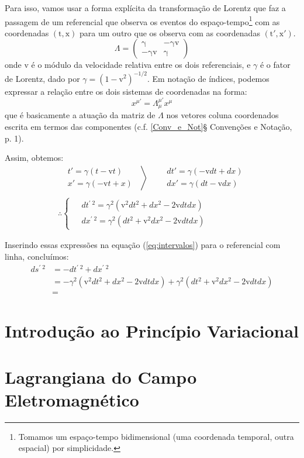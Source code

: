 \documentclass[12pt,a4paper]{article}
\begin{document}
Para isso, vamos   usar a forma explícita da transformação de Lorentz que faz a passagem de
um referencial que observa os eventos do espaço-tempo\footnote{Tomamos um espaço-tempo bidimensional (uma coordenada temporal, outra espacial) por simplicidade.} com as coordenadas $\mathrm{(t,x)}$ para um outro que
os observa com as coordenadas $\mathrm{(t',x')}$.
\begin{equation*}
  \Lambda = \begin{pmatrix*} \mathrm{\gamma} &  \mathrm{-\gamma v}\\
                          \mathrm{-\gamma v} & \mathrm{\gamma}  \end{pmatrix*}
\end{equation*}
onde $\mathrm{v}$ é o módulo da velocidade relativa entre os dois referenciais, e $\gamma$ é o fator de Lorentz, dado por
$\gamma = \mathrm{(1-v^2)^{-1/2}}$. Em notação de índices, podemos expressar a relação entre os dois sistemas 
de coordenadas na forma:
\begin{equation*}
x^{\mu'} = \Lambda^{\mu'}_{\mu} x^{\mu}
\end{equation*}
que é basicamente a atuação da matriz de $\Lambda$ nos vetores coluna coordenados escrita em termos das componentes (c.f. \ref{Conv_e_Not}{§ Convenções e Notação}, p. 1).

Assim, obtemos:
\begin{gather*}
  \left.
  \begin{aligned}
    &   t' = \gamma(t - \mathrm{v}t) \\
    &   x' = \gamma(-\mathrm{v}t + x) 
  \end{aligned}\;\;
  \right\rangle\;\;\;\;
  \begin{aligned}
    & dt' = \gamma(-\mathrm{v}dt +dx)\\
    & dx' = \gamma(dt - \mathrm{v}dx)
  \end{aligned}\\\\
  \therefore 
  \left\{\;
  \begin{aligned}
    & dt^{\prime\;2} = \gamma^2(\mathrm{v}^2dt^2 + dx^2 - 2\mathrm{v}dtdx)\\
    & dx^{\prime\;2} = \gamma^2(dt^2 + \mathrm{v}^2dx^2 - 2\mathrm{v}dtdx)
  \end{aligned}\right.
\end{gather*}

Inserindo essas expressões na equação (\ref{eq:intervalos}) para o referencial com linha, concluímos:
\begin{align}
  ds^{\prime\; 2} &= -dt^{\prime\; 2} + dx^{\prime\; 2} \nonumber \\
                  &= -\gamma^2(\mathrm{v}^2dt^2 + dx^2 - 2\mathrm{v}dtdx) + \gamma^2(dt^2 + \mathrm{v}^2dx^2 - 2\mathrm{v}dtdx) \nonumber \\
                  &=  
\end{align}


\section{Introdução ao Princípio Variacional}

\section{Lagrangiana do Campo Eletromagnético}

\newpage
\printbibliography
\end{document}
